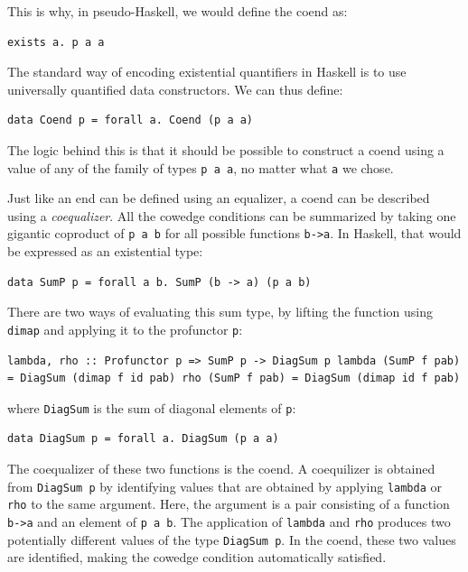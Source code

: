 This is why, in pseudo-Haskell, we would define the coend as:

\begin{verbatim}
exists a. p a a
\end{verbatim}

The standard way of encoding existential quantifiers in Haskell is to
use universally quantified data constructors. We can thus define:

\begin{verbatim}
data Coend p = forall a. Coend (p a a)
\end{verbatim}

The logic behind this is that it should be possible to construct a coend
using a value of any of the family of types \texttt{p\ a\ a}, no matter
what \texttt{a} we chose.

Just like an end can be defined using an equalizer, a coend can be
described using a \emph{coequalizer}. All the cowedge conditions can be
summarized by taking one gigantic coproduct of \texttt{p\ a\ b} for all
possible functions \texttt{b-\textgreater{}a}. In Haskell, that would be
expressed as an existential type:

\begin{verbatim}
data SumP p = forall a b. SumP (b -> a) (p a b)
\end{verbatim}

There are two ways of evaluating this sum type, by lifting the function
using \texttt{dimap} and applying it to the profunctor \texttt{p}:

\begin{verbatim}
lambda, rho :: Profunctor p => SumP p -> DiagSum p lambda (SumP f pab) = DiagSum (dimap f id pab) rho (SumP f pab) = DiagSum (dimap id f pab)
\end{verbatim}

where \texttt{DiagSum} is the sum of diagonal elements of \texttt{p}:

\begin{verbatim}
data DiagSum p = forall a. DiagSum (p a a)
\end{verbatim}

The coequalizer of these two functions is the coend. A coequilizer is
obtained from \texttt{DiagSum\ p} by identifying values that are
obtained by applying \texttt{lambda} or \texttt{rho} to the same
argument. Here, the argument is a pair consisting of a function
\texttt{b-\textgreater{}a} and an element of \texttt{p\ a\ b}. The
application of \texttt{lambda} and \texttt{rho} produces two potentially
different values of the type \texttt{DiagSum\ p}. In the coend, these
two values are identified, making the cowedge condition automatically
satisfied.

